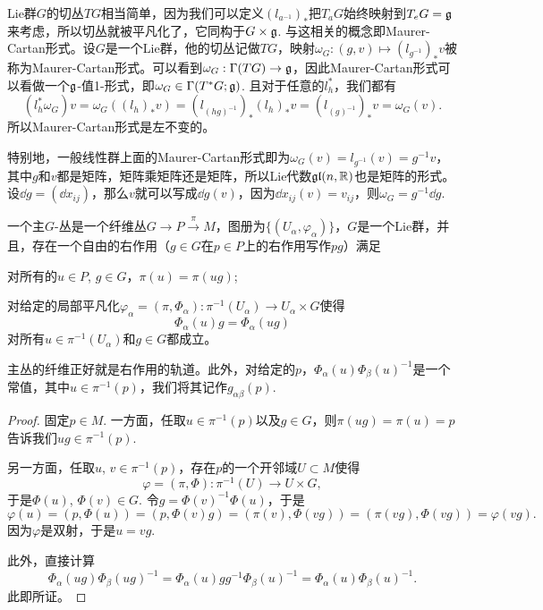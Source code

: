 \begin{para}[Lie群的切丛]
Lie群$G$的切丛$TG$相当简单，因为我们可以定义$(l_{a^{-1}})_*$把$T_aG$始终映射到$T_eG={\mathfrak{g}}$来考虑，所以切丛就被平凡化了，它同构于$G\times {\mathfrak{g}}$. 与这相关的概念即Maurer-Cartan形式。设$G$是一个Lie群，他的切丛记做$TG$，映射$\omega_G:(g,v)\mapsto (l_{g^{-1}})_*v$被称为Maurer-Cartan形式。可以看到$\omega_G:\Gamma(TG)\to {\mathfrak{g}}$，因此Maurer-Cartan形式可以看做一个${\mathfrak{g}}$-值1-形式，即$\omega_G\in \Gamma(T^*G;{\mathfrak{g}})$. 且对于任意的$l_h^*$，我们都有
\[
	(l_h^*\omega_G)v=\omega_G((l_h)_*v)=(l_{(hg)^{-1}})_*(l_h)_*v=(l_{(g)^{-1}})_*v=\omega_G(v).
\]
所以Maurer-Cartan形式是左不变的。

特别地，一般线性群上面的Maurer-Cartan形式即为$\omega_G(v)=l_{g^{-1}}(v)=g^{-1}v$，其中$g$和$v$都是矩阵，矩阵乘矩阵还是矩阵，所以Lie代数$\mathfrak{gl}(n,\mathbb{R})$也是矩阵的形式。设$\dd g=(\dd x_{ij})$，那么$v$就可以写成$\dd g(v)$，因为$\dd x_{ij}(v)=v_{ij}$，则$\omega_G=g^{-1}\dd g$.
\end{para}

\begin{para}[主$G$-丛]
一个主$G$-丛是一个纤维丛$G\to P\xrightarrow{\pi}M$，图册为$\{(U_\alpha,\varphi_\alpha)\}$，$G$是一个Lie群，并且，存在一个自由的右作用（$g\in G$在$p\in P$上的右作用写作$pg$）满足
\begin{compactenum}[~~~~(1)]
	\item 对所有的$u\in P$, $g\in G$，$\pi(u)=\pi(ug)$;
	\item 对给定的局部平凡化$\varphi_\alpha=(\pi,\Phi_\alpha):\pi^{-1}(U_\alpha)\to U_\alpha\times G$使得
	\[
	\Phi_\alpha(u)g=\Phi_\alpha(ug)
	\]
	对所有$u\in \pi^{-1}(U_\alpha)$和$g\in G$都成立。
\end{compactenum}
\end{para}

\begin{lem}
主丛的纤维正好就是右作用的轨道。此外，对给定的$p$，$\Phi_{\alpha}(u)\Phi_{\beta}(u)^{-1}$是一个常值，其中$u\in \pi^{-1}(p)$，我们将其记作$g_{\alpha\beta}(p)$.
\end{lem}

\begin{proof}
	固定$p\in M$. 一方面，任取$u\in\pi^{-1}(p)$以及$g\in G$，则$\pi(ug)=\pi(u)=p$告诉我们$ug\in \pi^{-1}(p)$. 

	另一方面，任取$u$, $v\in\pi^{-1}(p)$，存在$p$的一个开邻域$U\subset M$使得
	\[
	\varphi=(\pi,\Phi):\pi^{-1}(U)\to U\times G,
	\]
	于是$\Phi(u)$, $\Phi(v)\in G$. 令$g=\Phi(v)^{-1}\Phi(u)$，于是
	\[
	\varphi(u)=(p,\Phi(u))=(p,\Phi(v)g)=(\pi(v),\Phi(vg))=(\pi(vg),\Phi(vg))=\varphi(vg).
	\]
	因为$\varphi$是双射，于是$u=vg$.

	此外，直接计算
	\[
		\Phi_{\alpha}(ug)\Phi_{\beta}(ug)^{-1}=\Phi_{\alpha}(u)gg^{-1}\Phi_{\beta}(u)^{-1}=\Phi_{\alpha}(u)\Phi_{\beta}(u)^{-1}.
	\]
	此即所证。
\end{proof}

